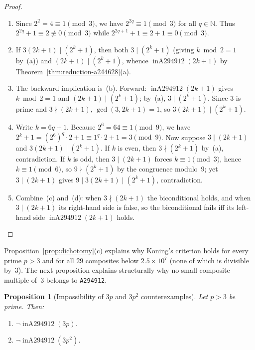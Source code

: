 \documentclass[11pt]{article}
\newtheorem{proposition}[theorem]{Proposition}
\theoremstyle{definition}
\newcommand{\N}{\mathbb{N}}
\newcommand{\seq}[1]{\texttt{#1}}
\newcommand{\inA}{\operatorname{inA294912}}
\begin{document}
\begin{proof}
\begin{enumerate}
\item[\textup{(a)}] Since $2^2 = 4 \equiv 1 \pmod 3$, we have $2^{2q} \equiv 1 \pmod 3$ for all $q \in \N$. Thus $2^{2q} + 1 \equiv 2 \not\equiv 0 \pmod 3$ while $2^{2q+1} + 1 \equiv 2 + 1 \equiv 0 \pmod 3$.
\item[\textup{(b)}] If $3(2k + 1) \mid (2^k + 1)$, then both $3 \mid (2^k + 1)$ (giving $k \bmod 2 = 1$ by~(a)) and $(2k + 1) \mid (2^k + 1)$, whence $\inA(2k + 1)$ by Theorem~\ref{thm:reduction-a244628}(a).
\item[\textup{(c)}] The backward implication is~(b). Forward: $\inA(2k + 1)$ gives $k \bmod 2 = 1$ and $(2k + 1) \mid (2^k + 1)$; by~(a), $3 \mid (2^k + 1)$. Since $3$ is prime and $3 \nmid (2k + 1)$, $\gcd(3, 2k + 1) = 1$, so $3(2k + 1) \mid (2^k + 1)$.
\item[\textup{(d)}] Write $k = 6q + 1$. Because $2^6 = 64 \equiv 1 \pmod 9$, we have $2^k + 1 = (2^6)^q \cdot 2 + 1 \equiv 1^q \cdot 2 + 1 = 3 \pmod 9$. Now suppose $3 \mid (2k + 1)$ and $3(2k + 1) \mid (2^k + 1)$. If $k$ is even, then $3 \nmid (2^k + 1)$ by~(a), contradiction. If $k$ is odd, then $3 \mid (2k + 1)$ forces $k \equiv 1 \pmod 3$, hence $k \equiv 1 \pmod 6$, so $9 \nmid (2^k + 1)$ by the congruence modulo~$9$; yet $3 \mid (2k + 1)$ gives $9 \mid 3(2k + 1) \mid (2^k + 1)$, contradiction.
\item[\textup{(e)}] Combine~(c) and~(d): when $3 \nmid (2k + 1)$ the biconditional holds, and when $3 \mid (2k + 1)$ its right-hand side is false, so the biconditional fails iff its left-hand side $\inA(2k + 1)$ holds. \qedhere
\end{enumerate}
\end{proof}

Proposition~\ref{prop:dichotomy}(c) explains why Koning's criterion holds for every prime $p > 3$ and for all $29$ composites below $2.5 \times 10^7$ (none of which is divisible by~$3$). The next proposition explains structurally why no small composite multiple of~$3$ belongs to \seq{A294912}.

\begin{proposition}[Impossibility of $3p$ and $3p^2$ counterexamples]
\label{prop:no-3p}
Let $p > 3$ be prime. Then:
\begin{enumerate}
\item[\textup{(a)}] $\neg \inA(3p)$.
\item[\textup{(b)}] $\neg \inA(3p^2)$.
\end{enumerate}
\end{proposition}
\end{document}
